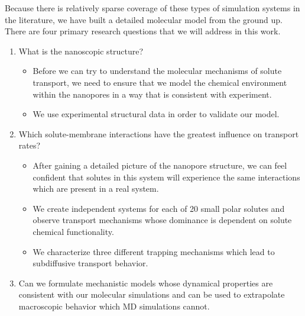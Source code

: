   Because there is relatively sparse coverage of these types of simulation systems in 
  the literature, we have built a detailed molecular model from the ground up. There 
  are four primary research questions that we will address in this work.
  \begin{enumerate}
    \item What is the nanoscopic structure?
    	\begin{itemize}
    	  \item Before we can try to understand the molecular mechanisms of solute
    	  transport, we need to ensure that we model the chemical environment
    	  within the nanopores in a way that is consistent with experiment.
    	  \item We use experimental structural data in order to validate our model.
    	\end{itemize}
    \item Which solute-membrane interactions have the greatest influence on transport rates?
    	\begin{itemize}
    	  \item After gaining a detailed picture of the nanopore structure, we can 
    	  feel confident that solutes in this system will experience the same 
    	  interactions which are present in a real system.
    	  \item We create independent systems for each of 20 small polar solutes 
    	  and observe transport mechanisms whose dominance is dependent on
    	  solute chemical functionality.
    	  \item We characterize three different trapping mechanisms which lead
    	  to subdiffusive transport behavior.
    	\end{itemize}
    \item Can we formulate mechanistic models whose dynamical properties are consistent with our
    molecular simulations and can be used to extrapolate macroscopic behavior which MD simulations cannot.
    	\begin{itemize}

\end{itemize}
\end{enumerate}
